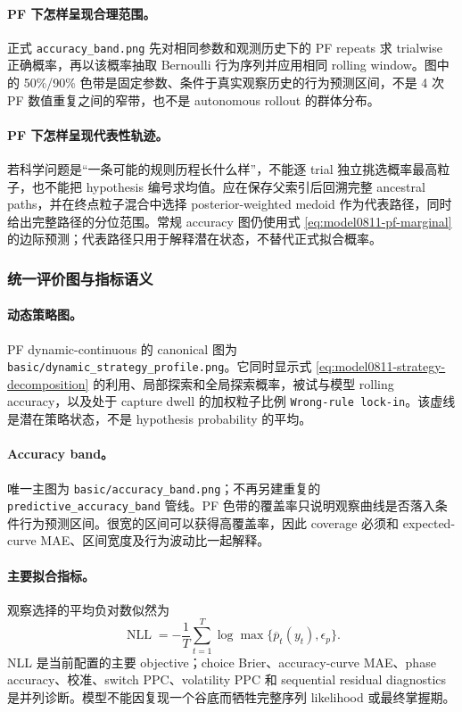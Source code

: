 \paragraph{PF 下怎样呈现合理范围。}
正式
\texttt{accuracy\_band.png} 先对相同参数和观测历史下的 PF repeats 求 trialwise 正确概率，再以该概率抽取 Bernoulli 行为序列并应用相同 rolling window。图中的 50\%/90\% 色带是固定参数、条件于真实观察历史的行为预测区间，不是 4 次 PF 数值重复之间的窄带，也不是 autonomous rollout 的群体分布。

\paragraph{PF 下怎样呈现代表性轨迹。}
若科学问题是“一条可能的规则历程长什么样”，不能逐 trial 独立挑选概率最高粒子，也不能把 hypothesis 编号求均值。应在保存父索引后回溯完整 ancestral paths，并在终点粒子混合中选择 posterior-weighted medoid 作为代表路径，同时给出完整路径的分位范围。常规 accuracy 图仍使用式
\ref{eq:model0811-pf-marginal} 的边际预测；代表路径只用于解释潜在状态，不替代正式拟合概率。


\subsubsection{统一评价图与指标语义}

\paragraph{动态策略图。}
PF dynamic-continuous 的 canonical 图为
\texttt{basic/dynamic\_strategy\_profile.png}。它同时显示式
\ref{eq:model0811-strategy-decomposition} 的利用、局部探索和全局探索概率，被试与模型 rolling accuracy，以及处于 capture dwell 的加权粒子比例
\texttt{Wrong-rule lock-in}。该虚线是潜在策略状态，不是 hypothesis probability 的平均。

\paragraph{Accuracy band。}
唯一主图为
\texttt{basic/accuracy\_band.png}；不再另建重复的
\texttt{predictive\_accuracy\_band} 管线。PF 色带的覆盖率只说明观察曲线是否落入条件行为预测区间。很宽的区间可以获得高覆盖率，因此 coverage 必须和 expected-curve MAE、区间宽度及行为波动比一起解释。

\paragraph{主要拟合指标。}
观察选择的平均负对数似然为
\begin{equation}
\operatorname{NLL}
=-\frac{1}{T}\sum_{t=1}^{T}
\log\max\{\overline p_t(y_t),\epsilon_p\}.
\label{eq:model0811-nll}
\end{equation}
NLL 是当前配置的主要 objective；choice Brier、accuracy-curve MAE、phase accuracy、校准、switch PPC、volatility PPC 和 sequential residual diagnostics 是并列诊断。模型不能因复现一个谷底而牺牲完整序列 likelihood 或最终掌握期。

